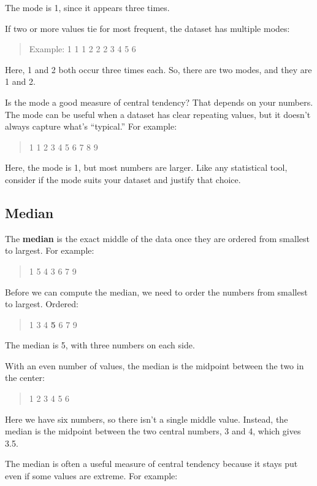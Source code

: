 \documentclass[
  letterpaper,
  DIV=11,
  numbers=noendperiod]{scrreprt}
\begin{document}
The mode is 1, since it appears three times.

If two or more values tie for most frequent, the dataset has multiple
modes:

\begin{quote}
Example: 1 1 1 2 2 2 3 4 5 6
\end{quote}

Here, 1 and 2 both occur three times each. So, there are two modes, and
they are 1 and 2.

Is the mode a good measure of central tendency? That depends on your
numbers. The mode can be useful when a dataset has clear repeating
values, but it doesn't always capture what's ``typical.'' For example:

\begin{quote}
1 1 2 3 4 5 6 7 8 9
\end{quote}

Here, the mode is 1, but most numbers are larger. Like any statistical
tool, consider if the mode suits your dataset and justify that choice.

\subsection{Median}\label{median}

The \textbf{median} is the exact middle of the data once they are
ordered from smallest to largest. For example:

\begin{quote}
1 5 4 3 6 7 9
\end{quote}

Before we can compute the median, we need to order the numbers from
smallest to largest. Ordered:

\begin{quote}
1 3 4 \textbf{5} 6 7 9
\end{quote}

The median is 5, with three numbers on each side.

With an even number of values, the median is the midpoint between the
two in the center:

\begin{quote}
1 2 3 4 5 6
\end{quote}

Here we have six numbers, so there isn't a single middle value. Instead,
the median is the midpoint between the two central numbers, 3 and 4,
which gives 3.5.

The median is often a useful measure of central tendency because it
stays put even if some values are extreme. For example:
\end{document}
